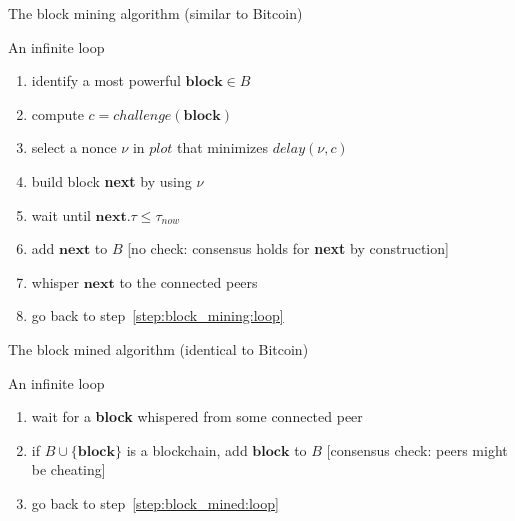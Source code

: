 \documentclass[11pt]{beamer}  %
\newcommand{\plot}{{\mathit{plot}}}
\newcommand{\challenge}{{\mathit{challenge}}}
\newcommand{\delay}{{\mathit{delay}}}
\newcommand{\now}{{\mathit{now}}}
\begin{document}
\begin{frame}{The block mining algorithm (similar to Bitcoin)}

  \begin{greenbox}{An infinite loop}
    \begin{enumerate}[<+->]
    \item\label{step:block_mining:loop} identify a most powerful $\mathbf{block}\in B$
    \item\label{step:block_mining:next_challenge} compute $c=\challenge(\mathbf{block})$
    \item\label{step:block_mining:next_deadline} select a nonce $\nu$ in $\plot$ that minimizes $\delay(\nu,c)$
    \item\label{step:block_mining:next_block} build block \textbf{next} by using $\nu$
    \item\label{step:block_mining:wait} wait until $\mathbf{next}.\tau\le\tau_\now$
    \item\label{step:block_mining:add} add $\mathbf{next}$ to $B$ [no check: consensus holds for \textbf{next} by construction]
    \item\label{step:block_mining:whisper} whisper $\mathbf{next}$ to the connected peers
    \item go back to step~\ref{step:block_mining:loop}
    \end{enumerate}
  \end{greenbox}

\end{frame}

\begin{frame}{The block mined algorithm (identical to Bitcoin)}

  \begin{greenbox}{An infinite loop}
    \begin{enumerate}[<+->]
    \item\label{step:block_mined:loop} wait for a \textbf{block} whispered from some connected peer
    \item\label{step:block_mined:add} if $B\cup\{\mathbf{block}\}$ is a blockchain, add $\mathbf{block}$ to $B$ [consensus check: peers might be cheating]
    \item go back to step~\ref{step:block_mined:loop}
    \end{enumerate}
  \end{greenbox}

\end{frame}
\end{document}
